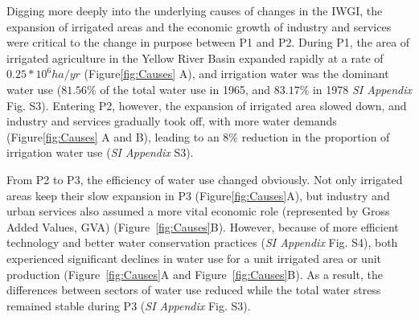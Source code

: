 Digging more deeply into the underlying causes of changes in the IWGI, the expansion of irrigated areas and the economic growth of industry and services were critical to the change in purpose between P1 and P2.
During P1, the area of irrigated agriculture in the Yellow River Basin expanded rapidly at a rate of $0.25*10^6 ha/yr$ (Figure\ref{fig:Causes} A), and irrigation water was the dominant water use ($81.56\%$ of the total water use in 1965, and $83.17\%$ in 1978 \textit{SI Appendix} Fig. S3).
Entering P2, however, the expansion of irrigated area slowed down, and industry and services gradually took off, with more water demands (Figure\ref{fig:Causes} A and B), leading to an $8\%$ reduction in the proportion of irrigation water use (\textit{SI Appendix} S3).

From P2 to P3, the efficiency of water use changed obviously.
Not only irrigated areas keep their slow expansion in P3 (Figure\ref{fig:Causes}A), but industry and urban services also assumed a more vital economic role (represented by Gross Added Values, GVA) (Figure~\ref{fig:Causes}B).
However, because of more efficient technology and better water conservation practices (\textit{SI Appendix} Fig. S4), both experienced significant declines in water use for a unit irrigated area or unit production (Figure~\ref{fig:Causes}A and Figure~\ref{fig:Causes}B).
As a result, the differences between sectors of water use reduced while the total water stress remained stable during P3 (\textit{SI Appendix} Fig. S3).

